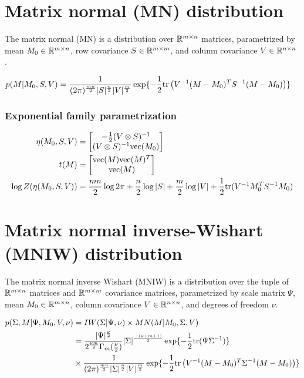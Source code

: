 \section{Matrix normal (MN) distribution}
\label{sec:stats-mn}

The matrix normal (MN) is 
a distribution over $\mathbb{R}^{m \times n}$
matrices, parametrized by 
mean $M_0 \in \mathbb{R}^{m \times n}$,
row covariance $S \in \mathbb{R}^{m \times m}$,
and column covariance $V \in \mathbb{R}^{n \times n}$ .


\begin{align}
        p(M | M_0, S, V) &= \frac{1}{(2\pi)^{\frac{mn}{2}}|S|^{\frac{n}{2}}|V|^{\frac{m}{2}}} \exp{-\frac{1}{2}\tr\left(V^{-1}(M - M_0)^TS^{-1}(M - M_0)\right)}
\end{align}

\subsubsection*{Exponential family parametrization}
\begin{align*}
    \eta(M_0, S, V) &= \begin{bmatrix}-\frac{1}{2}(V \otimes S)^{-1}\\(V \otimes S)^{-1}\mathrm{vec}(M_0)\end{bmatrix} \\
    t(M) &= \begin{bmatrix}\mathrm{vec}(M)\mathrm{vec}(M)^T\\\mathrm{vec}(M)\end{bmatrix} \\
    \log Z(\eta(M_0, S, V)) &= \frac{mn}{2}\log 2\pi + \frac{n}{2}\log|S| + \frac{m}{2}\log|V| + \frac{1}{2}\mathrm{tr}(V^{-1}M_0^TS^{-1}M_0) 
\end{align*}

\section{Matrix normal inverse-Wishart (MNIW) distribution}
\label{sec:stats-mniw}

The matrix normal inverse Wishart (MNIW) is 
a distribution over the tuple of $\mathbb{R}^{m \times n}$
matrices and $\mathbb{R}^{m \times m}$ covariance matrices, parametrized by 
scale matrix $\Psi$,
mean $M_0 \in \mathbb{R}^{m \times n}$,
column covariance $V \in \mathbb{R}^{n \times n}$,
and degrees of freedom $\nu$.


\begin{align}
        p(\Sigma, M | \Psi, M_0, V, \nu) &= \IW(\Sigma|\Psi, \nu) \times \MN(M|M_0, \Sigma, V) \\
        &= \frac{|\Psi|^{\frac{\nu}{2}}}{2^{\frac{\nu m}{2}}\Gamma_m(\frac{\nu}{2})}|\Sigma|^{\frac{-(\nu + m + 1)}{2}} \exp {-\frac{1}{2}\tr(\Psi\Sigma^{-1})} \\
        &\times \frac{1}{(2\pi)^{\frac{mn}{2}}|\Sigma|^{\frac{n}{2}}|V|^{\frac{m}{2}}} \exp{-\frac{1}{2}\tr\left(V^{-1}(M - M_0)^T\Sigma^{-1}(M - M_0)\right)}
\end{align}

